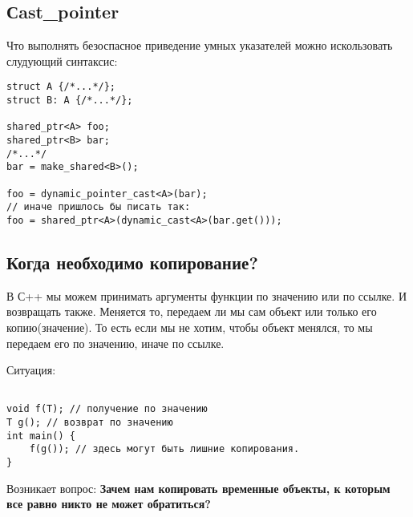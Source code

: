 \subsection{Сast\_pointer}
Что выполнять безоспасное приведение умных указателей можно искользовать слудующий синтаксис:
\begin{verbatim}
struct A {/*...*/};
struct B: A {/*...*/};

shared_ptr<A> foo;
shared_ptr<B> bar;
/*...*/
bar = make_shared<B>();

foo = dynamic_pointer_cast<A>(bar);
// иначе пришлось бы писать так:
foo = shared_ptr<A>(dynamic_cast<A>(bar.get()));

\end{verbatim}

\subsection{Когда необходимо копирование?}
В С++ мы можем принимать аргументы функции по значению или по ссылке. И возвращать также. Меняется то, передаем ли мы сам объект или только его копию(значение). То есть если мы не хотим, чтобы объект менялся, то мы передаем его по значению, иначе по ссылке.


Ситуация:
\begin{verbatim}

void f(T); // получение по значению
T g(); // возврат по значению
int main() {
    f(g()); // здесь могут быть лишние копирования.
}
\end{verbatim}


Возникает вопрос: \textbf{Зачем нам копировать временные объекты, к которым все равно никто не может обратиться?}


